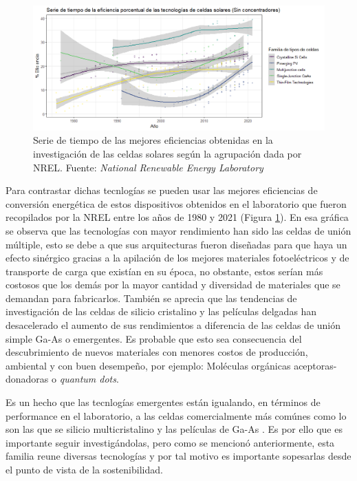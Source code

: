 \begin{figure}[h!]
    \begin{center}
        \includegraphics[scale=0.55]{img/SerieTiempo.png}
    \end{center}
    \caption{Serie de tiempo de las mejores eficiencias obtenidas en la investigación de las celdas solares según la agrupación dada por NREL.
    Fuente: \textit{National Renewable Energy Laboratory} \cite{nrel}}
    \label{img:SerieTiempo}
\end{figure}

Para contrastar dichas tecnlogías se pueden usar las mejores eficiencias de conversión energética de estos dispositivos obtenidos en el laboratorio que fueron recopilados por la NREL entre los años de 1980 y 2021 (Figura \ref{img:SerieTiempo}). En esa gráfica se observa que las tecnologías con mayor rendimiento han sido las celdas de unión múltiple, esto se debe a que sus arquitecturas fueron diseñadas para que haya un efecto sinérgico gracias a la apilación de los mejores materiales fotoeléctricos y de transporte de carga que existían en su época, no obstante, estos serían más costosos que los demás por la mayor cantidad y diversidad de materiales que se demandan para fabricarlos. También se aprecia que las tendencias de investigación de las celdas de silicio cristalino y las películas delgadas han desacelerado el aumento de sus rendimientos a diferencia de las celdas de unión simple Ga-As o emergentes. Es probable que esto sea consecuencia del descubrimiento de nuevos materiales con menores costos de producción, ambiental y con buen desempeño, por ejemplo: Moléculas orgánicas aceptoras-donadoras o \textit{quantum dots}.


Es un hecho que las tecnlogías emergentes están igualando, en términos de performance en el laboratorio, a las celdas comercialmente más comúnes como lo son las que se silicio multicristalino y las películas de Ga-As \cite{chowdhury2020overview}. Es por ello que es importante seguir investigándolas, pero como se mencionó anteriormente, esta familia reune diversas tecnologías y por tal motivo es importante sopesarlas desde el punto de vista de la sostenibilidad.

